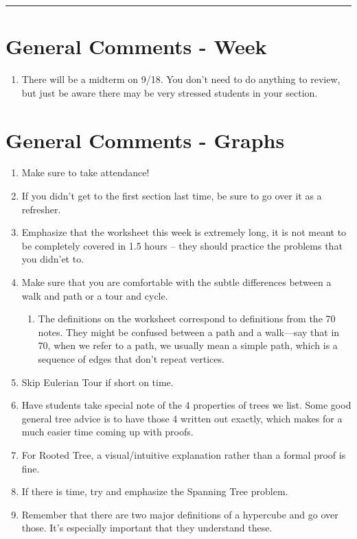 \documentclass{exam}
\title{}
\date{Graphs, Trees, Hypercubes, Bijections, FLT, Modular Arithmetic}
\begin{document}
\maketitle
\rule{\textwidth}{0.15em}
\fontsize{12}{15}\selectfont
\thispagestyle{empty}


\section{General Comments - Week} 
\begin{enumerate}
	\item There will be a midterm on 9/18. You don't need to do anything to review, but just be aware there may be very stressed students in your section. 
\end{enumerate}
\section{General Comments - Graphs}
\begin{enumerate}
\item Make sure to take attendance!
\item If you didn't get to the first section last time, be sure to go over it as a refresher.
\item Emphasize that the worksheet this week is extremely long, it is not meant to be completely covered in 1.5 hours -- they should practice the problems that you didn’et to.
\item Make sure that you are comfortable with the subtle differences between a walk and path or a tour and cycle. 
\begin{enumerate}
	\item The definitions on the worksheet correspond to definitions from the 70 notes. They might be confused between a path and a walk---say that in 70, when we refer to a path, we usually mean a simple path, which is a sequence of edges that don't repeat vertices. 
\end{enumerate}
\item Skip Eulerian Tour if short on time.
\item Have students take special note of the 4 properties of trees we list. Some good general tree advice is to have those 4 written out exactly, which makes for a much easier time coming up with proofs.
\item For Rooted Tree, a visual/intuitive explanation rather than a formal proof is fine. 
\item If there is time, try and emphasize the Spanning Tree problem.
\item Remember that there are two major definitions of a hypercube and go over those. It's especially important that they understand these. 
 
\end{enumerate}
\end{document}
